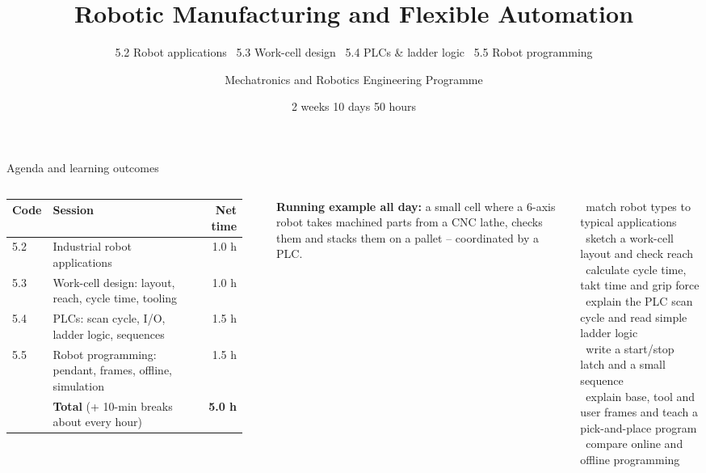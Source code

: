 \documentclass[aspectratio=169,10pt]{beamer}
\title[W2D3 -- Robot Applications, Work-Cells, PLCs, Programming]{Robotic Manufacturing and Flexible Automation}
\subtitle{5.2 Robot applications \textbullet\ 5.3 Work-cell design \textbullet\ 5.4 PLCs \& ladder logic \textbullet\ 5.5 Robot programming}
\author{Mechatronics and Robotics Engineering Programme}
\institute{Week 2 \textperiodcentered{} Day 3}
\date{2 weeks \textperiodcentered{} 10 days \textperiodcentered{} 50 hours}
\begin{document}
\begin{frame}[plain]\titlepage\end{frame}

\begin{frame}[t]{Agenda and learning outcomes}
\begin{columns}[T,onlytextwidth]
\footnotesize
\begin{tabularx}{\linewidth}{@{}l X r@{}}
\toprule
\textbf{Code} & \textbf{Session} & \textbf{Net time}\\
\midrule
5.2 & Industrial robot applications & 1.0 h\\
5.3 & Work-cell design: layout, reach, cycle time, tooling & 1.0 h\\
5.4 & PLCs: scan cycle, I/O, ladder logic, sequences & 1.5 h\\
5.5 & Robot programming: pendant, frames, offline, simulation & 1.5 h\\
\midrule
 & \textbf{Total} (+ 10-min breaks about every hour) & \textbf{5.0 h}\\
\bottomrule
\end{tabularx}\\[2mm]
\begin{notebox}
\textbf{Running example all day:} a small cell where a 6-axis robot takes machined parts from a CNC
lathe, checks them and stacks them on a pallet -- coordinated by a PLC.
\end{notebox}
\begin{keybox}
\small
\checkitem\ match robot types to typical applications\\
\checkitem\ sketch a work-cell layout and check reach\\
\checkitem\ calculate cycle time, takt time and grip force\\
\checkitem\ explain the PLC scan cycle and read simple ladder logic\\
\checkitem\ write a start/stop latch and a small sequence\\
\checkitem\ explain base, tool and user frames and teach a pick-and-place program\\
\checkitem\ compare online and offline programming
\end{keybox}
\end{columns}
\end{frame}
\end{document}
